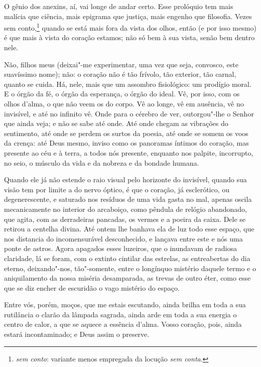 O gênio dos anexins, aí, vai longe de andar certo. Esse prolóquio
tem mais malícia que ciência, mais epigrama que justiça, mais engenho
que filosofia. Vezes sem conto,\footnote{\textit{sem conto}: variante menos empregada da locução \textit{sem conta}.} quando se está mais fora da vista dos olhos, então (e por
isso mesmo) é que mais à vista do coração estamos; não só bem à sua
vista, senão bem dentro nele.

Não, filhos meus (deixai"-me experimentar, uma vez que seja,
convosco, este suavíssimo nome); não: o coração não é tão frívolo, tão
exterior, tão carnal, quanto se cuida. Há, nele, mais que um assombro
fisiológico: um prodígio moral. E o órgão da fé, o órgão da esperança,
o órgão do ideal. Vê, por isso, com os olhos d'alma, o
que não veem os do corpo. Vê ao longe, vê em ausência, vê no invisível,
e até no infinito vê. Onde para o cérebro de ver, outorgou"-lhe o Senhor
que ainda veja; e não se sabe até onde. Até onde chegam as vibrações do
sentimento, até onde se perdem os surtos da poesia, até onde se somem
os voos da crença: até Deus mesmo, inviso como os panoramas íntimos do
coração, mas presente ao céu e à terra, a todos nós presente, enquanto nos palpite, incorrupto, no seio, o
músculo da vida e da nobreza e da bondade humana.

Quando ele já não estende o raio visual pelo horizonte do
invisível, quando sua visão tem por limite a do nervo óptico, é que o
coração, já esclerótico, ou degenerescente, e saturado nos resíduos de
uma vida gasta no mal, apenas oscila mecanicamente no interior do
arcaboiço, como pêndula de relógio abandonado, que agita, com as
derradeiras pancadas, os vermes e a poeira da caixa. Dele se retirou a
centelha divina. Até ontem lhe banhava ela de luz todo esse espaço, que
nos distancia do incomensurável desconhecido, e lançava entre este e
nós uma ponte de astros. Agora apagados esses luzeiros, que o inundavam
de radiosa claridade, lá se foram, com o extinto cintilar das estrelas,
as entreabertas do dia eterno, deixando"-nos, tão"-somente, entre o
longínquo mistério daquele termo e o aniquilamento da nossa miséria
desamparada, as trevas de outro éter, como esse que se diz encher de
escuridão o vago mistério do espaço.

Entre vós, porém, moços, que me estais escutando, ainda brilha em
toda a sua rutilância o clarão da lâmpada sagrada, ainda arde em toda a
sua energia o centro de calor, a que se aquece a essência
d'alma. Vosso coração, pois, ainda estará
incontaminado; e Deus assim o preserve.

